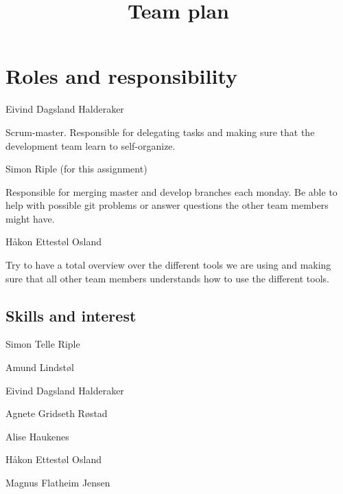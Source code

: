 \documentclass{article}
\title{Team plan}
\begin{document}
\date{}
\maketitle
{}

\section*{Roles and responsibility}
\begin{description}[align=right]
\item [Leader:] \hspace{6 mm} Eivind Dagsland Halderaker
\item \hspace*{4 mm} Scrum-master. Responsible for delegating tasks and making sure that the development team learn to self-organize. 
\item [Git repo:] \hspace{6 mm} Simon Riple (for this assignment)
\item \hspace*{4 mm} Responsible for merging master and develop branches each monday. Be able to help with possible git problems or answer questions the other team members might have.
\item [Tools:] \hspace{6 mm} Håkon Ettestøl Osland
\item \hspace*{4 mm} Try to have a total overview over the different tools we are using and making sure that all other team members understands how to use the different tools.
\end{description}

\subsection*{Skills and interest}
\begin{description}[align=right]
\item [Front end]
\item Simon Telle Riple
\item Amund Lindstøl
\item [Back end]
\item Eivind Dagsland Halderaker
\item Agnete Gridseth Røstad
\item Alise Haukenes
\item Håkon Ettestøl Osland
\item Magnus Flatheim Jensen
\end{description}
\end{document}
